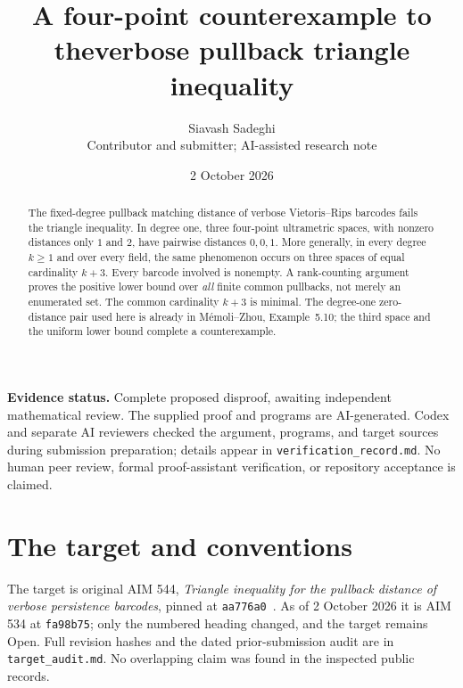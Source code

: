 \documentclass[11pt]{article}
\title{\vspace{-1.1em}A four-point counterexample to the\newline verbose pullback triangle inequality}
\author{Siavash Sadeghi\\\small Contributor and submitter; AI-assisted research note}
\date{2 October 2026}
\theoremstyle{remark}
\begin{document}
\maketitle
\vspace{-1.2em}
\begin{abstract}
The fixed-degree pullback matching distance of verbose Vietoris--Rips barcodes
fails the triangle inequality. In degree one, three four-point ultrametric
spaces, with nonzero distances only $1$ and $2$, have pairwise distances
$0,0,1$. More generally, in every degree $k\ge1$ and over every field, the
same phenomenon occurs on three spaces of equal cardinality $k+3$.
Every barcode involved is nonempty. A rank-counting argument proves the
positive lower bound over \emph{all} finite common pullbacks, not merely
an enumerated set. The common cardinality $k+3$ is minimal. The degree-one
zero-distance pair used here is already in M\'emoli--Zhou, Example~5.10;
the third space and the uniform lower bound complete a counterexample.
\end{abstract}

\textbf{Evidence status.} Complete proposed disproof, awaiting independent
mathematical review. The supplied proof and programs are AI-generated. Codex and separate
AI reviewers checked the argument, programs, and target sources during
submission preparation; details appear in \texttt{verification\_record.md}.
No human peer review, formal proof-assistant verification, or repository
acceptance is claimed.

\section{The target and conventions}
The target is original AIM 544, \emph{Triangle inequality for the pullback
distance of verbose persistence barcodes}, pinned at \texttt{aa776a0}~\cite{aim}.
As of 2 October 2026 it is AIM 534 at \texttt{fa98b75}; only the numbered
heading changed, and the target remains Open. Full revision hashes and the
dated prior-submission audit are in \texttt{target\_audit.md}. No overlapping
claim was found in the inspected public records.
\end{document}
